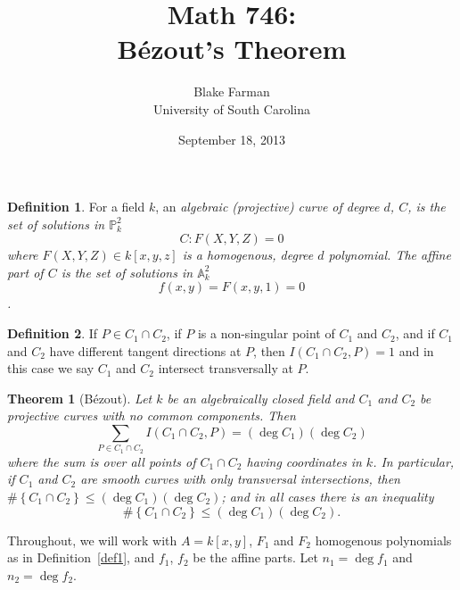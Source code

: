 \documentclass[10pt]{amsart}
\author{Blake Farman\\University of South Carolina}
\title{Math 746:\\B\'{e}zout's Theorem}
\date{September 18, 2013}
\begin{document}
\maketitle

\providecommand{\p}{\mathfrak{p}}
\providecommand{\m}{\mathfrak{m}}

\newtheorem{thm}{Theorem}
\newtheorem{lem}{Lemma}
\newtheorem{prop}{Proposition}
\theoremstyle{definition}
\newtheorem{defn}{Definition}

\newcommand{\A}{\mathbb{A}}

\begin{defn}\label{curve}
  For a field $k$, an \it{algebraic (projective) curve of degree $d$}, $C$, is the set of solutions in $\mathbb{P}^2_k$
  $$C \colon F(X,Y,Z) = 0$$
  where $F(X,Y,Z) \in k[x,y,z]$ is a homogenous, degree $d$ polynomial.
  The \it{affine part} of $C$ is the set of solutions in $\A_k^2$ $$f(x,y) = F(x,y,1) = 0$$.
\end{defn}

\begin{defn}\label{transverse}
  If $P \in C_1 \cap C_2$, if $P$ is a non-singular point of $C_1$ and $C_2$, and if $C_1$ and $C_2$ have different tangent directions at $P$, then $I(C_1 \cap C_2, P) = 1$ and in this case we say $C_1$ and $C_2$ intersect transversally at $P$.
\end{defn}

\begin{thm}[B\'{e}zout] 
  Let $k$ be an algebraically closed field and $C_1$ and $C_2$ be projective curves with no common components.
  Then 
  $$\sum_{P \in C_1 \cap C_2} I(C_1 \cap C_2, P) = (\deg{C_1})(\deg{C_2})$$
  where the sum is over all points of $C_1 \cap C_2$ having coordinates in $k$.
  In particular, if $C_1$ and $C_2$ are smooth curves with only transversal intersections, then $\#\left\{C_1 \cap C_2\right\} \leq (\deg{C_1})(\deg{C_2})$; and in all cases there is an inequality
  $$\#\left\{C_1 \cap C_2 \right\} \leq (\deg{C_1})(\deg{C_2}).$$
\end{thm}

Throughout, we will work with $A = k[x,y]$, $F_1$ and $F_2$ homogenous polynomials as in Definition~\ref{def1}, and $f_1$, $f_2$ be the affine parts.
Let $n_1 = \deg{f_1}$ and $n_2 = \deg{f_2}$.
\end{document}
